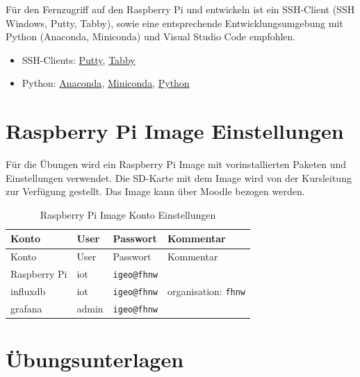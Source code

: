 \documentclass[
  11pt,
  a4paper,
  oneside, openany  ,captions=tableheading
]{scrbook}
\providecommand{\tightlist}{%
  \setlength{\itemsep}{0pt}\setlength{\parskip}{0pt}}
\theoremstyle{remark}
\renewcommand{\markright}[1]{\def\chaptertitle{#1}} %
\begin{document}
Für den Fernzugriff auf den Raspberry Pi und entwickeln ist ein
SSH-Client (SSH Windows, Putty, Tabby), sowie eine entsprechende
Entwicklungsumgebung mit Python (Anaconda, Miniconda) und Visual Studio
Code empfohlen.

\begin{itemize}
\tightlist
\item
  SSH-Clients: \href{https://www.putty.org}{Putty},
  \href{https://tabby.sh/}{Tabby}
\item
  Python: \href{https://www.anaconda.com/download}{Anaconda},
  \href{https://docs.conda.io/projects/miniconda/en/latest/}{Miniconda},
  \href{https://www.python.org/}{Python}
\end{itemize}

\section*{Raspberry Pi Image
Einstellungen}\label{raspberry-pi-image-einstellungen}

\markright{Raspberry Pi Image Einstellungen}

Für die Übungen wird ein Raspberry Pi Image mit vorinstallierten Paketen
und Einstellungen verwendet. Die SD-Karte mit dem Image wird von der
Kursleitung zur Verfügung gestellt. Das Image kann über Moodle bezogen
werden.

\begin{longtable}[]{@{}llll@{}}
\caption{Raspberry Pi Image Konto Einstellungen}\tabularnewline
\toprule\noalign{}
Konto & User & Passwort & Kommentar \\
\midrule\noalign{}
\endfirsthead
\toprule\noalign{}
Konto & User & Passwort & Kommentar \\
\midrule\noalign{}
\endhead
\bottomrule\noalign{}
\endlastfoot
Raspberry Pi & iot & \texttt{igeo@fhnw} & \\
influxdb & iot & \texttt{igeo@fhnw} & organisation: \texttt{fhnw} \\
grafana & admin & \texttt{igeo@fhnw} & \\
\end{longtable}

\section*{Übungsunterlagen}\label{uxfcbungsunterlagen}

\markright{Übungsunterlagen}
\end{document}
